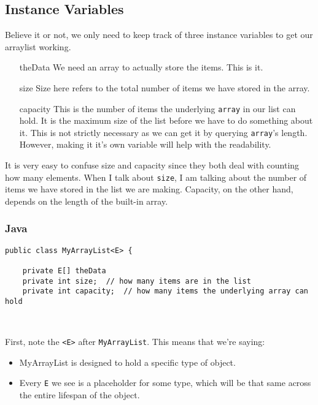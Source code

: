 
\subsection{Instance Variables}

Believe it or not, we only need to keep track of three instance variables to get our arraylist working.

\begin{enumerate}
	\item[theData]  We need an array to actually store the items.  This is it.
	\item[size] Size here refers to the total number of items we have stored in the array.
	\item[capacity]  This is the number of items  the underlying \texttt{array} in our list can hold. It is the maximum size of the list before we have to do something about it. This is not strictly necessary as we can get it by querying \texttt{array}'s length. However, making it it's own variable will help with the readability.
\end{enumerate}

It is very easy to confuse size and capacity since they both deal with counting how many elements.  When I talk about \texttt{size}, I am talking about the number of items we have stored in the list we are making.  Capacity, on the other hand, depends on the length of the built-in array. 

\subsubsection{Java}


\begin{verbatim}
public class MyArrayList<E> {
	
	private E[] theData
	private int size;  // how many items are in the list
	private int capacity;  // how many items the underlying array can hold
	
	
\end{verbatim}

First, note the \texttt{<E>} after \texttt{MyArrayList}.  This means that we're saying:
\begin{itemize}
	\item MyArrayList is designed to hold a specific type of object.
	\item Every \texttt{E} we see is a placeholder for some type, which will be that same across the entire lifespan of the object.
\end{itemize}


